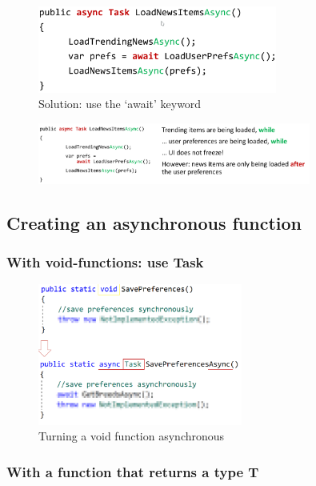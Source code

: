 \documentclass{article}
\begin{document}
\begin{figure}[H]
    \centering
    \includegraphics[width=0.7\textwidth]{async-news-solution.png}
    \caption{Solution: use the `await' keyword}
\end{figure}

\begin{figure}[H]
    \centering
    \includegraphics[width=0.8\textwidth]{async-news-solution2.png}
    \caption{}
\end{figure}

\subsection{Creating an asynchronous function}

\subsubsection{With void-functions: use Task}

\begin{figure}[H]
    \centering
    \includegraphics[width=0.6\textwidth]{async-void.png}
    \caption{Turning a void function asynchronous}
\end{figure}

\subsubsection{With a function that returns a type T}
\end{document}
